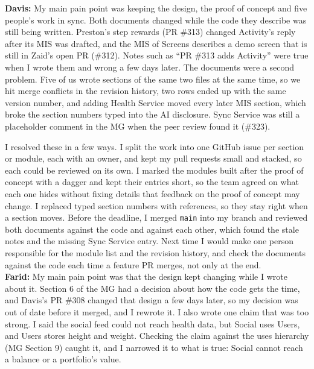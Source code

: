 \documentclass[12pt, titlepage]{article}
\begin{document}
\noindent\textbf{Davis:} My main pain point was keeping the design, the proof
of concept and five people's work in sync. Both documents changed while the
code they describe was still being written. Preston's step rewards (PR \#313)
changed Activity's reply after its MIS was drafted, and the MIS of Screens
describes a demo screen that is still in Zaid's open PR (\#312). Notes such as
``PR \#313 adds Activity'' were true when I wrote them and wrong a few days
later. The documents were a second problem. Five of us wrote sections of the
same two files at the same time, so we hit merge conflicts in the revision
history, two rows ended up with the same version number, and adding Health
Service moved every later MIS section, which broke the section numbers typed
into the AI disclosure. Sync Service was still a placeholder comment in the MG
when the peer review found it (\#323).

I resolved these in a few ways. I split the work into one GitHub issue per
section or module, each with an owner, and kept my pull requests small and
stacked, so each could be reviewed on its own. I marked the modules built after
the proof of concept with a dagger and kept their entries short, so the team
agreed on what each one hides without fixing details that feedback on the proof
of concept may change. I replaced typed section numbers with references, so
they stay right when a section moves. Before the deadline, I merged
\texttt{main} into my branch and reviewed both documents against the code and
against each other, which found the stale notes and the missing Sync Service
entry. Next time I would make one person responsible for the module list and
the revision history, and check the documents against the code each time a
feature PR merges, not only at the end. \\

\noindent\textbf{Farid:} My main pain point was that the design kept
changing while I wrote about it. Section 6 of the MG had a decision about how
the code gets the time, and Davis's PR \#308 changed that design a few days
later, so my decision was out of date before it merged, and I rewrote it. I
also wrote one claim that was too strong. I said the social feed could not
reach health data, but Social uses Users, and Users stores height and weight.
Checking the claim against the uses hierarchy (MG Section 9) caught it, and I
narrowed it to what is true: Social cannot reach a balance or a portfolio's
value.
\end{document}
